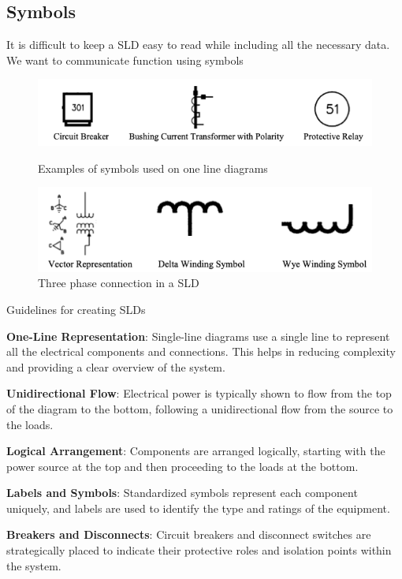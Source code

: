 \subsection{Symbols}
It is difficult to keep a SLD easy to read while including all the necessary data. We want to communicate function using symbols
\begin{figure}[H]
    \centering
    \includegraphics[scale = 0.5]{figs/ch03/sld_symbol.png}
    \caption{Examples of symbols used on one line diagrams}
    \includegraphics[scale = 0.5]{figs/ch03/sld_3phase.png}
    \caption{Three phase connection in a SLD}
\end{figure}

Guidelines for creating SLDs
\begin{pline}
    \item \textbf{One-Line Representation}: Single-line diagrams use a single line to represent all the electrical components and connections. This helps in reducing complexity and providing a clear overview of the system.
    \item \textbf{Unidirectional Flow}: Electrical power is typically shown to flow from the top of the diagram to the bottom, following a unidirectional flow from the source to the loads.
    \item \textbf{Logical Arrangement}: Components are arranged logically, starting with the power source at the top and then proceeding to the loads at the bottom.
    \item \textbf{Labels and Symbols}: Standardized symbols represent each component uniquely, and labels are used to identify the type and ratings of the equipment.
    \item \textbf{Breakers and Disconnects}: Circuit breakers and disconnect switches are strategically placed to indicate their protective roles and isolation points within the system.
\end{pline}


